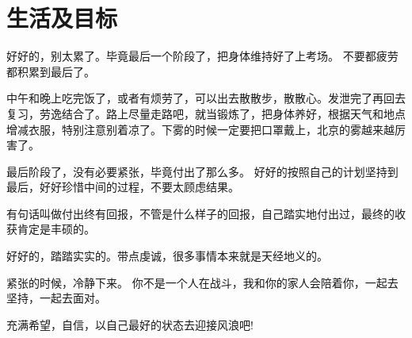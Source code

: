 \documentclass[a4paper]{ctexart}
\begin{document}
\section{生活及目标}
\par 好好的，别太累了。毕竟最后一个阶段了，把身体维持好了上考场。 不要都疲劳都积累到最后了。
\par 中午和晚上吃完饭了，或者有烦劳了，可以出去散散步，散散心。发泄完了再回去复习，劳逸结合了。路上尽量走路吧，就当锻炼了，把身体养好，根据天气和地点增减衣服，特别注意别着凉了。下雾的时候一定要把口罩戴上，北京的雾越来越厉害了。 
\par 最后阶段了，没有必要紧张，毕竟付出了那么多。 好好的按照自己的计划坚持到最后，好好珍惜中间的过程，不要太顾虑结果。
\par 有句话叫做付出终有回报，不管是什么样子的回报，自己踏实地付出过，最终的收获肯定是丰硕的。
\par 好好的，踏踏实实的。带点虔诚，很多事情本来就是天经地义的。
\par 紧张的时候，冷静下来。 你不是一个人在战斗，我和你的家人会陪着你，一起去坚持，一起去面对。
\par 充满希望，自信，以自己最好的状态去迎接风浪吧! 
\end{document}
